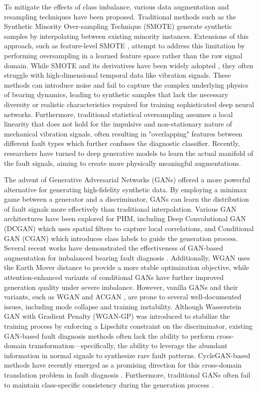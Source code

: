 \documentclass[conference,twocolumn]{IEEEtran}
\begin{document}
To mitigate the effects of class imbalance, various data augmentation and resampling techniques have been proposed. Traditional methods such as the Synthetic Minority Over-sampling Technique (SMOTE) \cite{6} generate synthetic samples by interpolating between existing minority instances. Extensions of this approach, such as feature-level SMOTE \cite{18}, attempt to address this limitation by performing oversampling in a learned feature space rather than the raw signal domain. While SMOTE and its derivatives have been widely adopted \cite{1, 2, 5, 35}, they often struggle with high-dimensional temporal data like vibration signals. These methods can introduce noise and fail to capture the complex underlying physics of bearing dynamics, leading to synthetic samples that lack the necessary diversity or realistic characteristics required for training sophisticated deep neural networks. Furthermore, traditional statistical oversampling assumes a local linearity that does not hold for the impulsive and non-stationary nature of mechanical vibration signals, often resulting in "overlapping" features between different fault types which further confuses the diagnostic classifier. Recently, researchers have turned to deep generative models to learn the actual manifold of the fault signals, aiming to create more physically meaningful augmentations.

The advent of Generative Adversarial Networks (GANs) \cite{1} offered a more powerful alternative for generating high-fidelity synthetic data. By employing a minimax game between a generator and a discriminator, GANs can learn the distribution of fault signals more effectively than traditional interpolation. Various GAN architectures have been explored for PHM, including Deep Convolutional GAN (DCGAN) \cite{14} which uses spatial filters to capture local correlations, and Conditional GAN (CGAN) which introduces class labels to guide the generation process. Several recent works have demonstrated the effectiveness of GAN-based augmentation for imbalanced bearing fault diagnosis \cite{33, 43}. Additionally, WGAN uses the Earth Mover distance to provide a more stable optimization objective, while attention-enhanced variants of conditional GANs \cite{34} have further improved generation quality under severe imbalance. However, vanilla GANs and their variants, such as WGAN \cite{2} and ACGAN \cite{5}, are prone to several well-documented issues, including mode collapse and training instability. Although Wasserstein GAN with Gradient Penalty (WGAN-GP) \cite{3} was introduced to stabilize the training process by enforcing a Lipschitz constraint on the discriminator, existing GAN-based fault diagnosis methods \cite{36, 37} often lack the ability to perform cross-domain transformation—specifically, the ability to leverage the abundant information in normal signals to synthesize rare fault patterns. CycleGAN-based methods have recently emerged as a promising direction for this cross-domain translation problem in fault diagnosis \cite{39}. Furthermore, traditional GANs often fail to maintain class-specific consistency during the generation process \cite{4, 36}.
\end{document}
